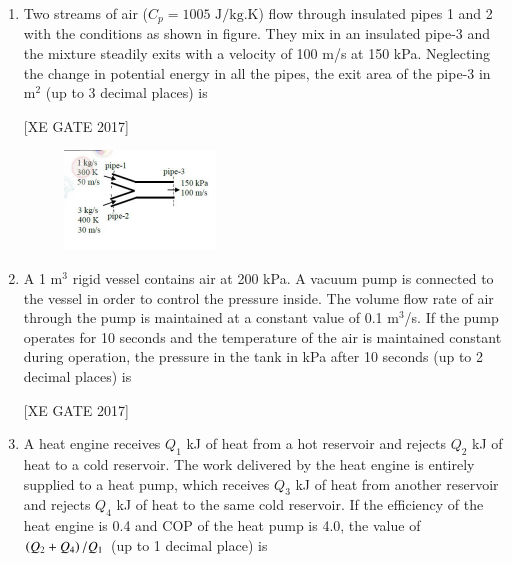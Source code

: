 \documentclass[journal,12pt,onecolumn]{IEEEtran}
\theoremstyle{remark}
\begin{document}
\begin{enumerate}
\hfill [XE GATE 2017]

\begin{enumerate}
\end{enumerate}
\item Two streams of air ($C_p = 1005 \text{ J/kg.K}$) flow through insulated pipes 1 and 2 with the conditions as shown in figure. They mix in an insulated pipe-3 and the mixture steadily exits with a velocity of 100 m/s at 150 kPa. Neglecting the change in potential energy in all the pipes, the exit area of the pipe-3 in $\text{m}^2$ (up to 3 decimal places) is \underline{\hspace{2cm}}

\hfill [XE GATE 2017]

\begin{figure}[H]
    \centering
    \includegraphics[width=0.5\linewidth]{figs/fig32.png}
    \caption{}
    \label{fig:placeholder}
\end{figure}

\item A 1 m$^3$ rigid vessel contains air at 200 kPa. A vacuum pump is connected to the vessel in order to control the pressure inside. The volume flow rate of air through the pump is maintained at a constant value of 0.1 m$^3$/s. If the pump operates for 10 seconds and the temperature of the air is maintained constant during operation, the pressure in the tank in kPa after 10 seconds (up to 2 decimal places) is  

\hfill [XE GATE 2017]


\item A heat engine receives $Q_1$ kJ of heat from a hot reservoir and rejects $Q_2$ kJ of heat to a cold reservoir. The work delivered by the heat engine is entirely supplied to a heat pump, which receives $Q_3$ kJ of heat from another reservoir and rejects $Q_4$ kJ of heat to the same cold reservoir. If the efficiency of the heat engine is 0.4 and COP of the heat pump is 4.0, the value of $\left(Q_2 + Q_4\right)/Q_1$ (up to 1 decimal place) is  


\end{enumerate}
\end{document}
